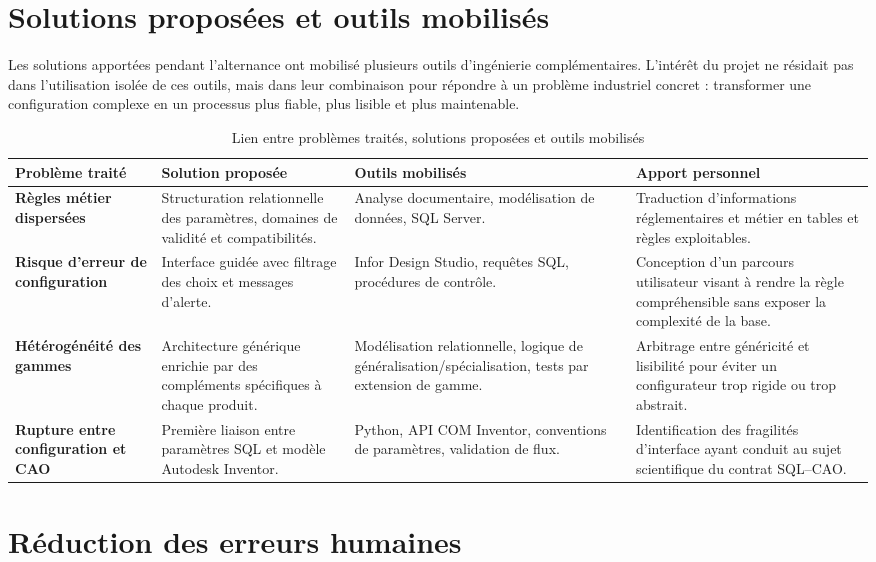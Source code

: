 \section{Solutions proposées et outils mobilisés}

Les solutions apportées pendant l'alternance ont mobilisé plusieurs outils d'ingénierie complémentaires. L'intérêt du projet ne résidait pas dans l'utilisation isolée de ces outils, mais dans leur combinaison pour répondre à un problème industriel concret : transformer une configuration complexe en un processus plus fiable, plus lisible et plus maintenable.

\begin{table}[H]
\centering
\caption{Lien entre problèmes traités, solutions proposées et outils mobilisés}
\begin{tabularx}{\textwidth}{>{\bfseries}p{}X X X}
\toprule
Problème traité & Solution proposée & Outils mobilisés & Apport personnel \\
\midrule
Règles métier dispersées & Structuration relationnelle des paramètres, domaines de validité et compatibilités. & Analyse documentaire, modélisation de données, SQL Server. & Traduction d'informations réglementaires et métier en tables et règles exploitables. \\
Risque d'erreur de configuration & Interface guidée avec filtrage des choix et messages d'alerte. & Infor Design Studio, requêtes SQL, procédures de contrôle. & Conception d'un parcours utilisateur visant à rendre la règle compréhensible sans exposer la complexité de la base. \\
Hétérogénéité des gammes & Architecture générique enrichie par des compléments spécifiques à chaque produit. & Modélisation relationnelle, logique de généralisation/spécialisation, tests par extension de gamme. & Arbitrage entre généricité et lisibilité pour éviter un configurateur trop rigide ou trop abstrait. \\
Rupture entre configuration et CAO & Première liaison entre paramètres SQL et modèle Autodesk Inventor. & Python, API COM Inventor, conventions de paramètres, validation de flux. & Identification des fragilités d'interface ayant conduit au sujet scientifique du contrat SQL--CAO. \\
\bottomrule
\end{tabularx}
\end{table}

\section{Réduction des erreurs humaines}


